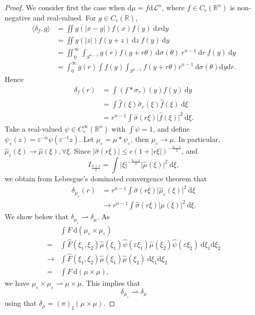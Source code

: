 \begin{proof}
We consider first the case when $\mathrm{d}\mu=f \mathrm{d}\mathcal{L}^{n}$, where $f \in C_{c}(\mathbb{R}^{n})$ is non-negative and real-valued. For $g \in C_{c}(\mathbb{R})$,
$$
\begin{aligned}
\langle \delta _{f},g \rangle  & = \iint g(\lvert x-y \rvert )f(x)f(y)\ \mathrm{d}x\mathrm{d}y \\
 & =\iint g(\lvert z \rvert )f(y+z)\ \mathrm{d}z\ f(y)\ \mathrm{d}y \\
 & =\iint _{0}^{\infty}\int _{S^{n-1}} g(r)f(g+r\theta)\ \mathrm{d}\sigma(\theta)\ r^{n-1}\ \mathrm{d}r\ f(y)\ \mathrm{d}y \\
 & =\int _{0}^{\infty}g(r)\int f(y)\int _{S^{n-1}}f(y+r\theta)r^{n-1}\ \mathrm{d}\sigma(\theta)\mathrm{d}y\mathrm{d}r.
\end{aligned}
$$
Hence
$$
\begin{aligned}
\delta _{f}(r) & =\int(f*\sigma _{r})(y)f(y)\ \mathrm{d}y \\
 & =\int \hat{f}(\xi)\hat{\sigma}_{r}(\xi)\bar{\hat{f}}(\xi)\ \mathrm{d}\xi \\
 & =r^{n-1}\int \hat{\sigma}(r\xi)\lvert \hat{f}(\xi) \rvert ^{2}\ \mathrm{d}\xi.
\end{aligned}
$$
Take a real-valued $\psi \in C_{c}^{\infty}(\mathbb{R}^{n})$ with $\displaystyle \int \psi=1$, 
and define $\psi_{\varepsilon}(z)=\varepsilon ^{-n}\psi(\varepsilon ^{-1}z)$. 
Let $\mu _{\varepsilon}=\mu* \psi_{\varepsilon}$, then $\mu_{\varepsilon}\to \mu$. 
In particular, $\hat{\mu}_{\varepsilon}(\xi)\to \hat{\mu}(\xi), \forall \xi$.
Since $\lvert \hat{\sigma}(r\xi) \rvert\leq c(1+\lvert r\xi \rvert)^{-\frac{n-1}{2}}$, and
$$
I_{\frac{n+1}{2}}=\int \lvert \xi \rvert ^{-\frac{n-1}{2}}\lvert \hat{\mu}(\xi) \rvert ^{2}\ \mathrm{d}\xi,
$$
we obtain from Lebesgue's dominated convergence theorem that
$$
\begin{aligned}
\delta _{\mu _{\varepsilon}}(r) & =r^{n-1} \int \hat{\sigma}(r\xi)\lvert \hat{\mu}_{\varepsilon}(\xi) \rvert ^{2}\ \mathrm{d}\xi \\
 & \to r^{n-1}\int \hat{\sigma}(r\xi)\lvert \mu(\xi) \rvert ^{2}\ \mathrm{d}\xi.
\end{aligned}
$$
We show below that $\delta _{\mu _{\varepsilon}}\rightharpoonup \delta _{\mu}$. As
$$
\begin{aligned}
 & \int F \ \mathrm{d}(\mu _{\varepsilon}\times \mu _{\varepsilon}) \\
= & \int \hat{F}(\xi_{1},\xi_{2}) \hat{\mu}(\xi_{1})\hat{\psi}(\varepsilon \xi_{1})\hat{\mu}(\xi_{2})\hat{\psi}(\varepsilon \xi_{2})\ \mathrm{d}\xi_{1}\mathrm{d}\xi_{2} \\
\to & \int \hat{F}(\xi_{1},\xi_{2})\hat{\mu}(\xi_{1})\hat{\mu}(\xi_{2})\ \mathrm{d}\xi_{1} \mathrm{d}\xi_{2} \\
= & \int F\ \mathrm{d}(\mu \times \mu),
\end{aligned}
$$
we have $\mu _{\varepsilon}\times \mu _{\varepsilon}\rightharpoonup \mu \times \mu$. This implies that
$$
\delta _{\mu _{\varepsilon}}\rightharpoonup \delta _{\mu}
$$
using that $\delta _{\mu}=(\pi)_{\sharp}(\mu\times \mu)$.
\end{proof}

